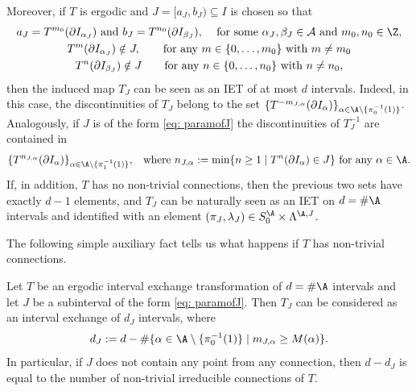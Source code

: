 Moreover, if $T$ is ergodic and $J=[a_J,b_J)\subseteq I$ is chosen so that
\begin{equation}\label{eq: paramofJ}
\begin{gathered}
\text{$a_J=T^{m_0}(\partial I_{\alpha_J})$ and $b_J=T^{n_0}(\partial I_{\beta_J})$, \quad for some $\alpha_J,\beta_J\in\mathcal A$ and $m_0,n_0\in\Z$,} \\
T^{m}(\partial I_{\alpha_J})\notin J, \qquad \text{for any } m \in \{0, \ldots, m_0\} \text{ with } m \neq m_0 \\
T^n(\partial I_{\beta_J})\notin J \qquad \text{for any } n \in \{0, \ldots, n_0\} \text{ with } n \neq n_0,
\end{gathered}
\end{equation}
then the induced map $T_J$ can be seen as an IET of at most $d$ intervals. Indeed, in this case, the discontinuities of $T_J$ belong to the set $
\{T^{-m_{J,\alpha}}(\partial I_{\alpha})\}_{\alpha\in \A\setminus \{\pi_0^{-1}(1)\}}$. Analogously, if $J$ is of the form \eqref{eq: paramofJ} the discontinuities of $T_J^{-1}$ are contained in
\[
\{T^{n_{J,\alpha}}(\partial I_{\alpha})\}_{\alpha\in \A\setminus \{\pi_1^{-1}(1)\}},\!\quad \text{where}\ n_{J,\alpha}:=\min\{n\geq 1\mid T^{n}(\partial I_{\alpha})\in J\} \text{ for any } \alpha \in \A.
\]
If, in addition, $T$ has no non-trivial connections, then the previous two sets have exactly $d - 1$ elements, and $T_J$ can be naturally seen as an IET on $d=\#\A$ intervals and identified with an element $(\pi_J, \lambda_J) \in S_0^\A \times \Lambda^{\A, J}$.

The following simple auxiliary fact tells us what happens if $T$ has non-trivial
connections.

\begin{lemma}\label{lem: alphabetafetrconnections}
Let $T$ be an ergodic interval exchange transformation of $d=\#\A$ intervals and let $J$ be a subinterval of the form \eqref{eq: paramofJ}. Then $T_J$ can be considered as an interval exchange of $d_J$ intervals, where
\[
d_J:= d - \#\{\alpha\in\A\setminus \{\pi_0^{-1}(1)\} \mid m_{J,\alpha}\ge M(\alpha)\}.
\]
In particular, if $J$ does not contain any point from any connection, then $d-d_J$ is equal to the number of non-trivial irreducible connections of $T$.
\end{lemma}

